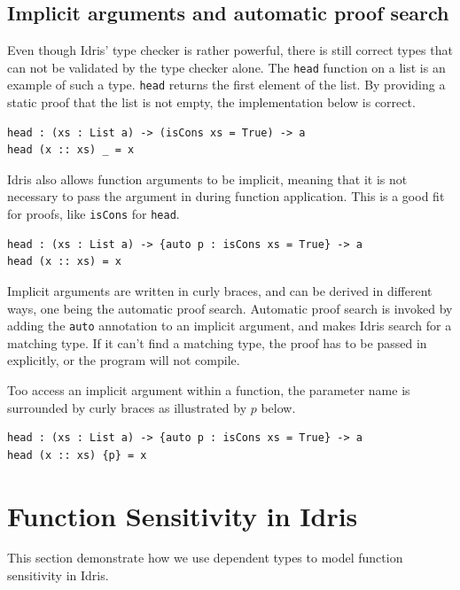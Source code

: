 \documentclass[12pt]{article}
\begin{document}
\subsection{Implicit arguments and automatic proof search}

Even though Idris' type checker is rather powerful, there is still correct types that can not be validated by the type checker alone.
The \lstinline{head} function on a list is an example of such a type.
\lstinline{head} returns the first element of the list.
By providing a static proof that the list is not empty, the implementation below is correct.

\begin{lstlisting}
head : (xs : List a) -> (isCons xs = True) -> a
head (x :: xs) _ = x
\end{lstlisting}

Idris also allows function arguments to be implicit, meaning that it is not necessary to pass the argument in during function application.
This is a good fit for proofs, like \lstinline{isCons} for \lstinline{head}.

\begin{lstlisting}
head : (xs : List a) -> {auto p : isCons xs = True} -> a
head (x :: xs) = x
\end{lstlisting}

Implicit arguments are written in curly braces, and can be derived in different ways, one being the automatic proof search.
Automatic proof search is invoked by adding the \lstinline{auto} annotation to an implicit argument, and makes Idris search for a matching type.
If it can't find a matching type, the proof has to be passed in explicitly, or the program will not compile.

Too access an implicit argument within a function, the parameter name is surrounded by curly braces as illustrated by $p$ below.

\begin{lstlisting}
head : (xs : List a) -> {auto p : isCons xs = True} -> a
head (x :: xs) {p} = x
\end{lstlisting}

\section{Function Sensitivity in Idris}\label{sec:function_sensitivity}

This section demonstrate how we use dependent types to model function sensitivity in Idris.
\end{document}
